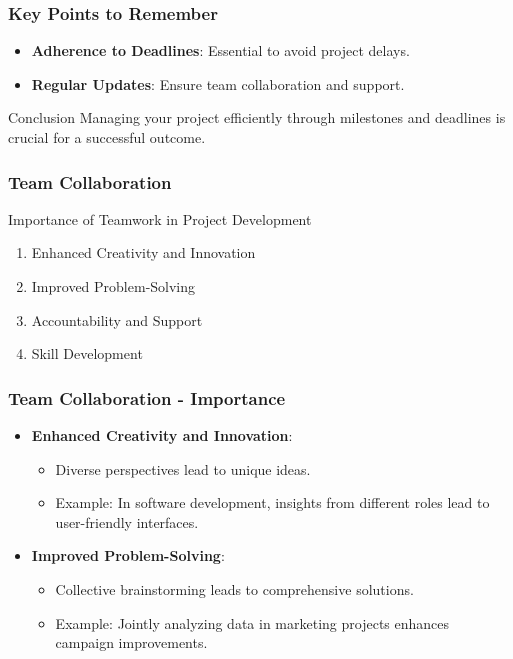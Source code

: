\documentclass[aspectratio=169]{beamer}
\begin{document}
\begin{frame}[fragile]
  \frametitle{Key Points to Remember}
  \begin{itemize}
    \item \textbf{Adherence to Deadlines}: Essential to avoid project delays.
    \item \textbf{Regular Updates}: Ensure team collaboration and support.
  \end{itemize}
  \begin{block}{Conclusion}
    Managing your project efficiently through milestones and deadlines is crucial for a successful outcome.
  \end{block}
\end{frame}

\begin{frame}[fragile]
    \frametitle{Team Collaboration}
    \begin{block}{Importance of Teamwork in Project Development}
        \begin{enumerate}
            \item Enhanced Creativity and Innovation
            \item Improved Problem-Solving
            \item Accountability and Support
            \item Skill Development
        \end{enumerate}
    \end{block}
\end{frame}

\begin{frame}[fragile]
    \frametitle{Team Collaboration - Importance}
    \begin{itemize}
        \item \textbf{Enhanced Creativity and Innovation}:
            \begin{itemize}
                \item Diverse perspectives lead to unique ideas.
                \item Example: In software development, insights from different roles lead to user-friendly interfaces.
            \end{itemize}
        \item \textbf{Improved Problem-Solving}:
            \begin{itemize}
                \item Collective brainstorming leads to comprehensive solutions.
                \item Example: Jointly analyzing data in marketing projects enhances campaign improvements.
            \end{itemize}
    \end{itemize}
\end{frame}
\end{document}
